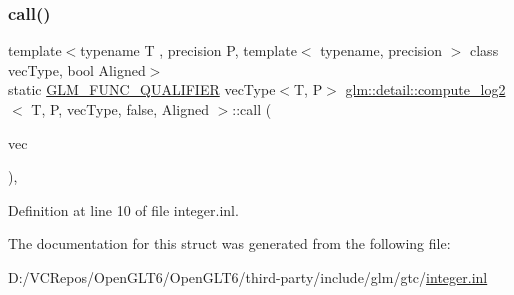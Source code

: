 \subsubsection{\texorpdfstring{call()}{call()}}
{\footnotesize\ttfamily template$<$typename T , precision P, template$<$ typename, precision $>$ class vec\+Type, bool Aligned$>$ \\
static \mbox{\hyperlink{setup_8hpp_a33fdea6f91c5f834105f7415e2a64407}{G\+L\+M\+\_\+\+F\+U\+N\+C\+\_\+\+Q\+U\+A\+L\+I\+F\+I\+ER}} vec\+Type$<$T, P$>$ \mbox{\hyperlink{structglm_1_1detail_1_1compute__log2}{glm\+::detail\+::compute\+\_\+log2}}$<$ T, P, vec\+Type, false, Aligned $>$\+::call (\begin{DoxyParamCaption}\item[{vec\+Type$<$ T, P $>$ const \&}]{vec }\end{DoxyParamCaption})\hspace{0.3cm}{\ttfamily [inline]}, {\ttfamily [static]}}



Definition at line 10 of file integer.\+inl.



The documentation for this struct was generated from the following file\+:\begin{DoxyCompactItemize}
\item 
D\+:/\+V\+C\+Repos/\+Open\+G\+L\+T6/\+Open\+G\+L\+T6/third-\/party/include/glm/gtc/\mbox{\hyperlink{gtc_2integer_8inl}{integer.\+inl}}\end{DoxyCompactItemize}
